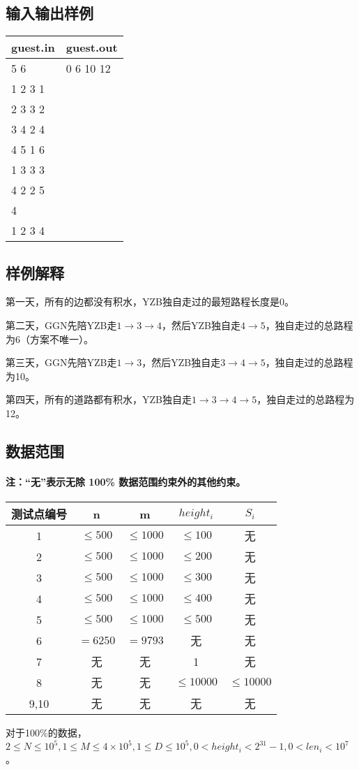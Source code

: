 \documentclass[12pt]{ctexart}
\begin{document}
\subsection{输入输出样例}
\begin{center}
	\begin{tabular}{|p{6cm}|p{6cm}|}
		\hline guest.in&guest.out\\
		\hline5 6&0 6 10 12\\
				1 2 3 1&\\
				2 3 3 2&\\
				3 4 2 4&\\
				4 5 1 6&\\
				1 3 3 3&\\
				4 2 2 5&\\
				4&\\
				1 2 3 4&\\
		\hline
	\end{tabular}
\end{center}
\subsection{样例解释}
第一天，所有的边都没有积水，YZB独自走过的最短路程长度是0。

第二天，GGN先陪YZB走$1\to3\to4$，然后YZB独自走$4\to5$，独自走过的总路程为6（方案不唯一）。

第三天，GGN先陪YZB走$1\to3$，然后YZB独自走$3\to4\to5$，独自走过的总路程为10。

第四天，所有的道路都有积水，YZB独自走$1\to3\to4\to5$，独自走过的总路程为12。
\subsection{数据范围}
\paragraph{注：“无”表示无除 100\% 数据范围约束外的其他约束。}
\begin{center}
	\begin{tabular}{|c|c|c|c|c|}
		\hline 测试点编号&n&m&$height_i$&$S_i$\\
		\hline 1&$\le500$&$\le1000$&$\le100$&无\\
		\hline 2&$\le500$&$\le1000$&$\le200$&无\\
		\hline 3&$\le500$&$\le1000$&$\le300$&无\\
		\hline 4&$\le500$&$\le1000$&$\le400$&无\\
		\hline 5&$\le500$&$\le1000$&$\le500$&无\\
		\hline 6&$=6250$&$=9793$&无&无\\
		\hline 7&无&无&1&无\\
		\hline 8&无&无&$\le10000$&$\le10000$\\
		\hline 9,10&无&无&无&无\\
		\hline
	\end{tabular}
\end{center}
对于100\%的数据，$2\leq N\leq10^5,1\leq M\leq4\times10^5,1\leq D\leq10^5,0<height_i<2^{31}-1,0<len_i<10^7$。
\end{document}
